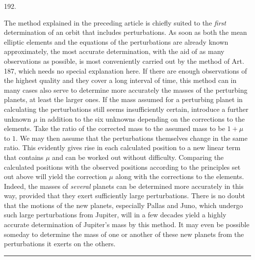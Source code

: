 \begin{center}\hypertarget{native-266-article192}{}192.\end{center}
The method explained in the preceding article is chiefly suited to the
\emph{first} determination of an orbit that includes perturbations. As soon
as both the mean elliptic elements and the equations of the perturbations
are already known approximately, the most accurate determination, with
the aid of as many observations as possible, is most conveniently carried
out by the method of Art. 187, which needs no special explanation here.
If there are enough observations of the highest quality and they cover a
long interval of time, this method can in many cases also serve to determine
more accurately the masses of the perturbing planets, at least the larger
ones. If the mass assumed for a perturbing planet in calculating the
perturbations still seems insufficiently certain, introduce a further
unknown $\mu$ in addition to the six unknowns depending on the corrections
to the elements. Take the ratio of the corrected mass to the assumed mass
to be $1+\mu$ to $1$. We may then assume that the perturbations themselves
change in the same ratio. This evidently gives rise in each calculated
position to a new linear term that contains $\mu$ and can be worked out
without difficulty. Comparing the calculated positions with the observed
positions according to the principles set out above will yield
the correction $\mu$ along with the corrections to the elements. Indeed, the
masses of \emph{several} planets can be determined more accurately in this
way, provided that they exert sufficiently large perturbations.
There is no doubt that the motions of the new planets, especially Pallas
and Juno, which undergo such large perturbations from Jupiter, will in a
few decades yield a highly accurate determination of Jupiter's mass by this
method. It may even be possible someday to determine the mass of one or
another of these new planets from the perturbations it exerts on
the others.
\begin{center}\rule{3cm}{.4pt}\end{center}
